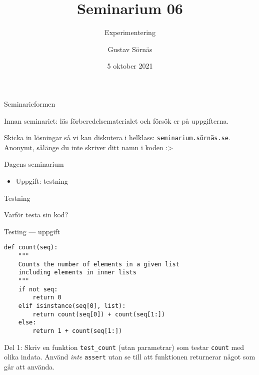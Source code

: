 \documentclass{beamer}
\title{Seminarium 06}
\subtitle{Experimentering}
\date{5 oktober 2021}
\author{Gustav Sörnäs}
\begin{document}
  \frame{\titlepage}

  \begin{frame}{Seminarieformen}

    Innan seminariet: läs förberedelsematerialet och försök er på uppgifterna.

    Skicka in lösningar så vi kan diskutera i helklass:
    \texttt{seminarium.sörnäs.se}. Anonymt, sålänge du inte skriver ditt namn i
    koden :>

  \end{frame}

  \begin{frame}{Dagens seminarium}

    \begin{itemize}
      \item Uppgift: testning
    \end{itemize}

  \end{frame}

  \begin{frame}{Testning}

    Varför testa sin kod?

  \end{frame}

  \begin{frame}[fragile]{Testing --- uppgift}
    
    \begin{lstlisting}
def count(seq):
    """
    Counts the number of elements in a given list
    including elements in inner lists
    """
    if not seq:
        return 0
    elif isinstance(seq[0], list):
        return count(seq[0]) + count(seq[1:])
    else:
        return 1 + count(seq[1:])
    \end{lstlisting}

    Del 1: Skriv en funktion \texttt{test\_count} (utan parametrar) som testar
    \texttt{count} med olika indata. Använd \emph{inte} \texttt{assert} utan se till
    att funktionen returnerar något som går att använda.


  \end{frame}

  \begin{frame}

    

  \end{frame}
\end{document}
